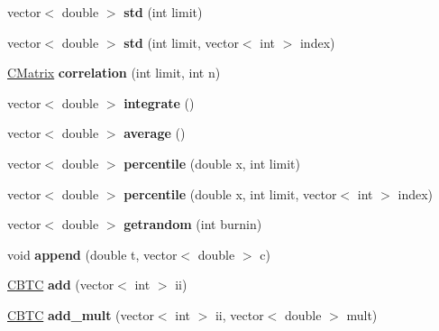 \begin{DoxyCompactItemize}
\mbox{\label{class_c_b_t_c_set_ac2f1c810a52321f6553b21465e4ca727}} 
vector$<$ double $>$ {\bfseries std} (int limit)
\item 
\mbox{\label{class_c_b_t_c_set_a622fa207137ff3c9513d7de875a5c48b}} 
vector$<$ double $>$ {\bfseries std} (int limit, vector$<$ int $>$ index)
\item 
\mbox{\label{class_c_b_t_c_set_a222df8b1ea03390d1f08ae029eb0c98d}} 
\hyperlink{class_c_matrix}{C\+Matrix} {\bfseries correlation} (int limit, int n)
\item 
\mbox{\label{class_c_b_t_c_set_a36d62ff7deddd5e48551e389d7b5f84f}} 
vector$<$ double $>$ {\bfseries integrate} ()
\item 
\mbox{\label{class_c_b_t_c_set_a9ce3a9cb55c0fd633147d7410a78cb5f}} 
vector$<$ double $>$ {\bfseries average} ()
\item 
\mbox{\label{class_c_b_t_c_set_a451b47e36698a64f226ea2f7c7dedadc}} 
vector$<$ double $>$ {\bfseries percentile} (double x, int limit)
\item 
\mbox{\label{class_c_b_t_c_set_ac570da9a3c92d9f0c8aef9224ae9bead}} 
vector$<$ double $>$ {\bfseries percentile} (double x, int limit, vector$<$ int $>$ index)
\item 
\mbox{\label{class_c_b_t_c_set_a54c3484d3694883eaddb459d269c99df}} 
vector$<$ double $>$ {\bfseries getrandom} (int burnin)
\item 
\mbox{\label{class_c_b_t_c_set_abcdf19476ec40e687f62eaa627a4c783}} 
void {\bfseries append} (double t, vector$<$ double $>$ c)
\item 
\mbox{\label{class_c_b_t_c_set_adb53b1b3484868db05079c6250c0c590}} 
\hyperlink{class_c_b_t_c}{C\+B\+TC} {\bfseries add} (vector$<$ int $>$ ii)
\item 
\mbox{\label{class_c_b_t_c_set_a7c2b912f4506965c4cada6cac85c1692}} 
\hyperlink{class_c_b_t_c}{C\+B\+TC} {\bfseries add\+\_\+mult} (vector$<$ int $>$ ii, vector$<$ double $>$ mult)

\end{DoxyCompactItemize}
